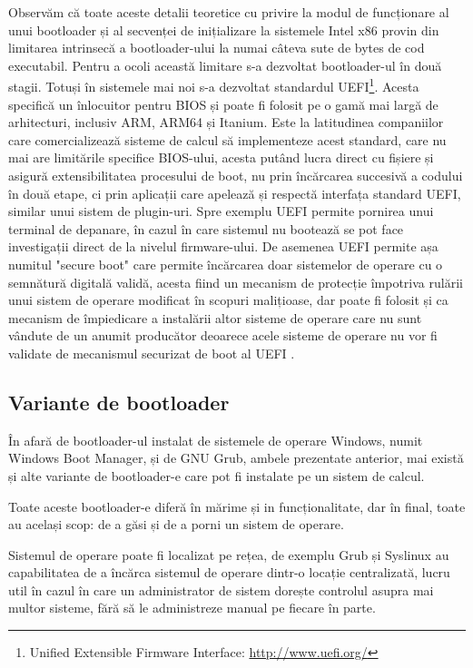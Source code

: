 \documentclass[12pt,a4paper,titlepage]{report}
\begin{document}
Observăm că toate aceste detalii teoretice cu privire la modul de funcționare al unui bootloader și al secvenței de inițializare la sistemele Intel x86 provin din limitarea intrinsecă a bootloader-ului la numai câteva sute de bytes de cod executabil. Pentru a ocoli această limitare s-a dezvoltat bootloader-ul în două stagii. Totuși în sistemele mai noi s-a dezvoltat standardul UEFI\footnote{Unified Extensible Firmware Interface: \url{http://www.uefi.org/}}. Acesta specifică 
un înlocuitor pentru BIOS și poate fi folosit pe o gamă mai largă de arhitecturi, inclusiv ARM, ARM64 și Itanium\cite{uefiSpec}. Este la latitudinea companiilor care comercializează sisteme de calcul să implementeze acest standard, care nu mai are limitările specifice BIOS-ului, acesta putând lucra direct cu fișiere și asigură extensibilitatea procesului de boot,  nu prin încărcarea succesivă a codului în două etape, ci prin aplicații care apelează și respectă interfața standard UEFI, similar unui sistem de plugin-uri.
Spre exemplu UEFI permite pornirea unui terminal de depanare, în cazul în care sistemul nu bootează se pot face investigații direct de la nivelul firmware-ului. De asemenea UEFI permite așa numitul "secure boot" \cite{uefiSpec} care permite încărcarea doar sistemelor de operare cu o semnătură digitală validă, acesta fiind un mecanism de protecție împotriva rulării unui sistem de operare modificat în scopuri malițioase, dar poate fi folosit și ca mecanism de împiedicare a instalării altor sisteme de operare care nu sunt vândute de un anumit producător deoarece acele sisteme de operare nu vor fi validate de mecanismul securizat de boot al UEFI \cite{zdnetSecureBoot}.

\subsection{Variante de bootloader}

În afară de bootloader-ul instalat de sistemele de operare Windows, numit Windows Boot Manager, și de GNU Grub, ambele prezentate anterior, mai există și alte variante de bootloader-e care pot fi instalate pe un sistem de calcul.

Toate aceste bootloader-e diferă în mărime și in funcționalitate, dar în final, toate au același scop: de a găsi și de a porni un sistem de operare.

Sistemul de operare poate fi localizat pe rețea, de exemplu Grub și Syslinux au capabilitatea de a încărca sistemul de operare dintr-o locație centralizată, lucru util în cazul în care un administrator de sistem dorește controlul asupra mai multor sisteme, fără să le administreze manual pe fiecare în parte.
\end{document}
